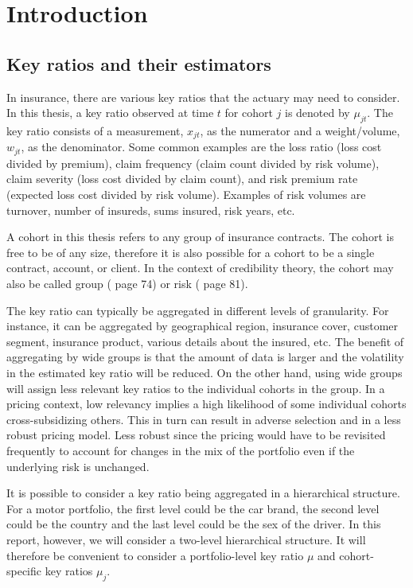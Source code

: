 \documentclass[11pt]{article}
\theoremstyle{definition}
\begin{document}
\tableofcontents
\newpage

\section{Introduction}
\subsection{Key ratios and their estimators}\label{sec:key_ratios}
In insurance, there are various key ratios that the actuary may need to consider. In this thesis, a key ratio observed at time $t$ for cohort $j$ is denoted by $\mu_{jt}$. The key ratio consists of a measurement, $x_{jt}$, as the numerator and a weight/volume, $w_{jt}$, as the denominator. Some common examples are the loss ratio (loss cost divided by premium), claim frequency (claim count divided by risk volume), claim severity (loss cost divided by claim count), and risk premium rate (expected loss cost divided by risk volume). Examples of risk volumes are turnover, number of insureds, sums insured, risk years, etc.

A cohort in this thesis refers to any group of insurance contracts. The cohort is free to be of any size, therefore it is also possible for a cohort to be a single contract, account, or client. In the context of credibility theory, the cohort may also be called group (\cite{esbjorn} page 74) or risk (\cite{buhlmann} page 81).

The key ratio can typically be aggregated in different levels of granularity. For instance, it can be aggregated by geographical region, insurance cover, customer segment, insurance product, various details about the insured, etc. The benefit of aggregating by wide groups is that the amount of data is larger and the volatility in the estimated key ratio will be reduced. On the other hand, using wide groups will assign less relevant key ratios to the individual cohorts in the group. In a pricing context, low relevancy implies a high likelihood of some individual cohorts cross-subsidizing others. This in turn can result in adverse selection and in a less robust pricing model. Less robust since the pricing would have to be revisited frequently to account for changes in the mix of the portfolio even if the underlying risk is unchanged.

It is possible to consider a key ratio being aggregated in a hierarchical structure. For a motor portfolio, the first level could be the car brand, the second level could be the country and the last level could be the sex of the driver. In this report, however, we will consider a two-level hierarchical structure. It will therefore be convenient to consider a portfolio-level key ratio $\mu$ and cohort-specific key ratios $\mu_j$. 
\end{document}
